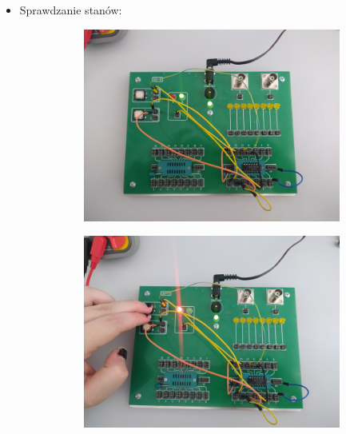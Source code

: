 \begin{itemize}
            \item Sprawdzanie stanów:
                \begin{figure}[H]
                    \centering
                        \begin{subfigure}[h]{0.4\textwidth}
                            \includegraphics[width=\textwidth]{img/NAND/funkcje/1652306732527_scaled.png}
                        \end{subfigure}
                        \begin{subfigure}[h]{0.4\textwidth}
                            \includegraphics[width=\textwidth]{img/NAND/funkcje/1652306732517_scaled.png}
                        \end{subfigure}

\end{figure}
\end{itemize}
